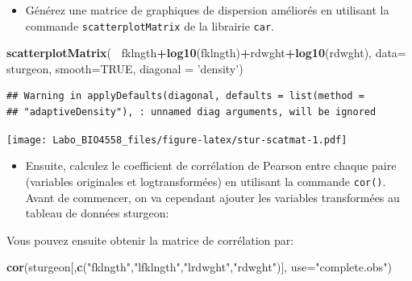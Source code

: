 \documentclass[12pt,]{book}
\newenvironment{Shaded}{\begin{snugshade}}{\end{snugshade}}
\newcommand{\DataTypeTok}[1]{\textcolor[rgb]{0.13,0.29,0.53}{#1}}
\newcommand{\KeywordTok}[1]{\textcolor[rgb]{0.13,0.29,0.53}{\textbf{#1}}}
\newcommand{\NormalTok}[1]{#1}
\newcommand{\OperatorTok}[1]{\textcolor[rgb]{0.81,0.36,0.00}{\textbf{#1}}}
\newcommand{\OtherTok}[1]{\textcolor[rgb]{0.56,0.35,0.01}{#1}}
\newcommand{\StringTok}[1]{\textcolor[rgb]{0.31,0.60,0.02}{#1}}
\providecommand{\tightlist}{%
  \setlength{\itemsep}{0pt}\setlength{\parskip}{0pt}}
\begin{document}
\begin{itemize}
\tightlist
\item
  Générez une matrice de graphiques de dispersion améliorés en utilisant la commande \texttt{scatterplotMatrix} de la librairie \texttt{car}.
\end{itemize}

\begin{Shaded}
\begin{Highlighting}[]
\KeywordTok{scatterplotMatrix}\NormalTok{(}
  \OperatorTok{~}\NormalTok{fklngth}\OperatorTok{+}\KeywordTok{log10}\NormalTok{(fklngth)}\OperatorTok{+}\NormalTok{rdwght}\OperatorTok{+}\KeywordTok{log10}\NormalTok{(rdwght),}
  \DataTypeTok{data=}\NormalTok{ sturgeon,}
  \DataTypeTok{smooth=}\OtherTok{TRUE}\NormalTok{, }\DataTypeTok{diagonal =} \StringTok{'density'}\NormalTok{)}
\end{Highlighting}
\end{Shaded}

\begin{verbatim}
## Warning in applyDefaults(diagonal, defaults = list(method =
## "adaptiveDensity"), : unnamed diag arguments, will be ignored
\end{verbatim}

\texttt{[image: Labo\_BIO4558\_files/figure-latex/stur-scatmat-1.pdf]}

\begin{itemize}
\tightlist
\item
  Ensuite, calculez le coefficient de corrélation de Pearson entre chaque paire (variables originales et logtransformées) en utilisant la commande \texttt{cor()}.
  Avant de commencer, on va cependant ajouter les variables transformées au tableau de données sturgeon:
\end{itemize}

\begin{Shaded}
\end{Shaded}

Vous pouvez ensuite obtenir la matrice de corrélation par:

\begin{Shaded}
\begin{Highlighting}[]
\KeywordTok{cor}\NormalTok{(sturgeon[,}\KeywordTok{c}\NormalTok{(}\StringTok{"fklngth"}\NormalTok{,}\StringTok{"lfklngth"}\NormalTok{,}\StringTok{"lrdwght"}\NormalTok{,}\StringTok{"rdwght"}\NormalTok{)], }\DataTypeTok{use=}\StringTok{"complete.obs"}\NormalTok{)}
\end{Highlighting}
\end{Shaded}
\end{document}

